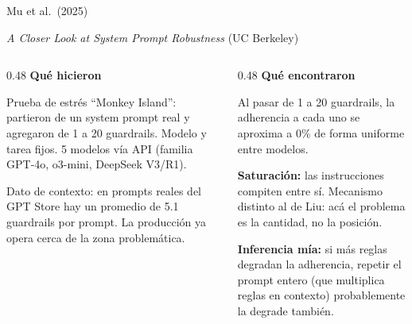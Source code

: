 \documentclass[aspectratio=169, 11pt]{beamer}
\begin{document}

\begin{frame}{Mu et al.\ (2025)}

\textit{A Closer Look at System Prompt Robustness} (UC Berkeley)

\vspace{0.6em}

\begin{columns}[T]
\begin{column}{0.48\textwidth}
\textbf{Qu\'e hicieron}

\vspace{0.3em}
\footnotesize
Prueba de estr\'es ``Monkey Island'': partieron de un system prompt real y agregaron de \alert{1 a 20 guardrails}. Modelo y tarea fijos. 5 modelos v\'ia API (familia GPT-4o, o3-mini, DeepSeek V3/R1).

\vspace{0.6em}

Dato de contexto: en prompts reales del GPT Store hay un \alert{promedio de 5.1 guardrails} por prompt. La producci\'on ya opera cerca de la zona problem\'atica.
\end{column}

\begin{column}{0.48\textwidth}
\textbf{Qu\'e encontraron}

\vspace{0.3em}
\footnotesize
Al pasar de 1 a 20 guardrails, la adherencia a cada uno \alert{se aproxima a 0\%} de forma uniforme entre modelos.

\vspace{0.6em}

\textbf{Saturaci\'on:} las instrucciones compiten entre s\'i. Mecanismo distinto al de Liu: ac\'a el problema es la \alert{cantidad}, no la posici\'on.

\vspace{0.6em}

\textbf{Inferencia m\'ia:} si m\'as reglas degradan la adherencia, repetir el prompt entero (que multiplica reglas en contexto) probablemente la degrade tambi\'en.
\end{column}
\end{columns}

\end{frame}

\end{document}
